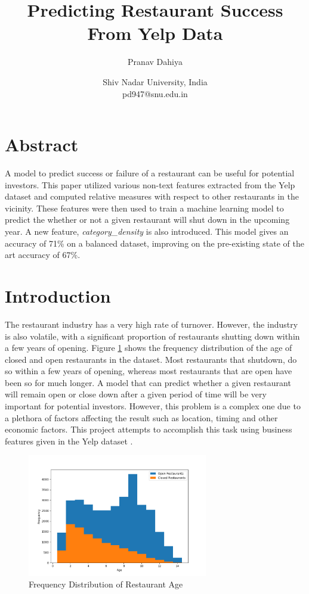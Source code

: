 \documentclass[12pt]{article}
\title{Predicting Restaurant Success From Yelp Data}
\author{Pranav Dahiya}
\date{Shiv Nadar University, India\\pd947@snu.edu.in}
\begin{document}
  \maketitle

  \section*{Abstract}

  A model to predict success or failure of a restaurant can be useful for potential investors. This paper utilized various non-text features extracted from the Yelp dataset and computed relative measures with respect to other restaurants in the vicinity. These features were then used to train a machine learning model to predict the whether or not a given restaurant will shut down in the upcoming year. A new feature, \emph{category\_density} is also introduced. This model gives an accuracy of 71\% on a balanced dataset, improving on the pre-existing state of the art accuracy of 67\%.

  \section{Introduction}

  The restaurant industry has a very high rate of turnover. However, the industry is also volatile, with a significant proportion of restaurants shutting down within a few years of opening. Figure \ref{fig:age} shows the frequency distribution of the age of closed and open restaurants in the dataset. Most restaurants that shutdown, do so within a few years of opening, whereas most restaurants that are open have been so for much longer. A model that can predict whether a given restaurant will remain open or close down after a given period of time will be very important for potential investors. However, this problem is a complex one due to a plethora of factors affecting the result such as location, timing and other economic factors. This project attempts to accomplish this task using business features given in the Yelp dataset \cite{yelp}.

  \begin{figure}[H]
    \centering
    \includegraphics[width=0.7\textwidth]{Figure_1.png}
    \caption{Frequency Distribution of Restaurant Age}
    \label{fig:age}
  \end{figure}
\end{document}
